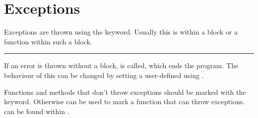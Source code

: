 \section{Exceptions}
    Exceptions are thrown using the  keyword. Usually this is within a  block or a function within such a block.
\vspace{-2mm}
\vspace{-4mm}
\columnwidth\rule[0mm]{0.6\columnwidth}{0.1pt}
\vspace{-2mm}
\vspace{-2mm}
    If an error is thrown without a  block,  is called, which ends the program.
    The behaviour of this can be changed by setting a user-defined  using .
    
    Functions and methods that don't throw exceptions should be marked with the  keyword. Otherwise  can be used to mark a function that can throw exceptions.
     can be found within .
    